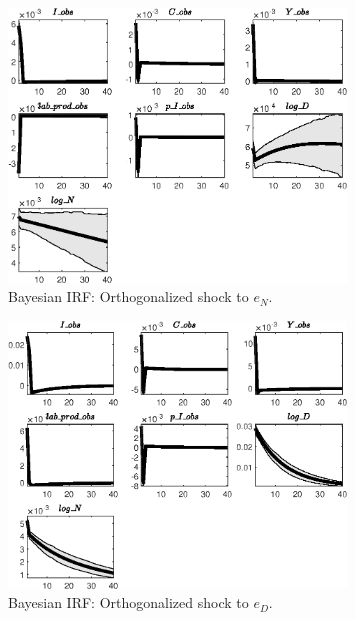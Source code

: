 \begin{figure}[H]
\centering 
\includegraphics[width=0.80\textwidth]{BRS_fd/Output/BRS_fd_Bayesian_IRF_e_N_1}
\caption{Bayesian IRF: Orthogonalized shock to ${e_N}$.}
\label{Fig:BayesianIRF:e_N:1}
\end{figure}
 
\begin{figure}[H]
\centering 
\includegraphics[width=0.80\textwidth]{BRS_fd/Output/BRS_fd_Bayesian_IRF_e_D_1}
\caption{Bayesian IRF: Orthogonalized shock to ${e_D}$.}
\label{Fig:BayesianIRF:e_D:1}
\end{figure}
 
